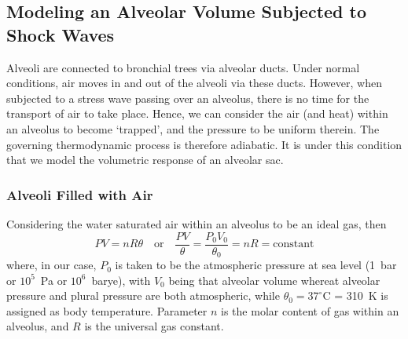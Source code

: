 \subsection{Modeling an Alveolar Volume Subjected to Shock Waves}
\label{sec:IdealGasLaw}

Alveoli are connected to bronchial trees via alveolar ducts.  Under normal conditions, air moves in and out of the alveoli via these ducts.  However, when subjected to a stress wave passing over an alveolus, there is no time for the transport of air to take place.  Hence, we can consider the air (and heat) within an alveolus to become `trapped', and the pressure to be uniform therein.  The governing thermo\-dynamic process is therefore adiabatic.  It is under this condition that we model the volumetric response of an alveolar sac.

\subsubsection{Alveoli Filled with Air}

Considering the water saturated air within an alveolus to be an ideal gas, then \cite{Davison08}
\begin{equation}
P V = n \! R \theta
\quad \text{or} \quad
\frac{P V}{\theta} = \frac{P_0 V_0}{\theta_0} = n \! R = \mathrm{constant}
\label{idealGas}
\end{equation}
where, in our case, $P_0$ is taken to be the atmospheric pressure at sea level (1~bar or $10^5$~Pa or $10^6$~barye), with $V_0$ being that alveolar volume whereat alveolar pressure and plural pressure are both atmospheric, while $\theta_0 = 37^{\circ}$C = 310~K is assigned as body temperature.  Parameter $n$ is the molar content of gas within an alveolus, and $R$ is the universal gas constant.  

